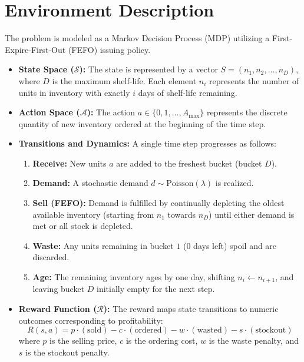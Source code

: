 \documentclass{article}
\begin{document}
\section{Environment Description}
The problem is modeled as a Markov Decision Process (MDP) utilizing a First-Expire-First-Out (FEFO) issuing policy. 
\begin{itemize}
    \item \textbf{State Space ($\mathcal{S}$):} 
    The state is represented by a vector $S = (n_1, n_2, \dots, n_D)$, where $D$ is the maximum shelf-life. Each element $n_i$ represents the number of units in inventory with exactly $i$ days of shelf-life remaining.
    
    \item \textbf{Action Space ($\mathcal{A}$):} 
    The action $a \in \{0, 1, \dots, A_{\max}\}$ represents the discrete quantity of new inventory ordered at the beginning of the time step.
    
    \item \textbf{Transitions and Dynamics:} 
    A single time step progresses as follows:
    \begin{enumerate}
        \item \textbf{Receive:} New units $a$ are added to the freshest bucket (bucket $D$).
        \item \textbf{Demand:} A stochastic demand $d \sim \text{Poisson}(\lambda)$ is realized.
        \item \textbf{Sell (FEFO):} Demand is fulfilled by continually depleting the oldest available inventory (starting from $n_1$ towards $n_D$) until either demand is met or all stock is depleted.
        \item \textbf{Waste:} Any units remaining in bucket $1$ (0 days left) spoil and are discarded.
        \item \textbf{Age:} The remaining inventory ages by one day, shifting $n_{i} \leftarrow n_{i+1}$, and leaving bucket $D$ initially empty for the next step.
    \end{enumerate}
    
    \item \textbf{Reward Function ($\mathcal{R}$):} 
    The reward maps state transitions to numeric outcomes corresponding to profitability:
    \begin{equation}
        R(s, a) = p \cdot (\text{sold}) - c \cdot (\text{ordered}) - w \cdot (\text{wasted}) - s \cdot (\text{stockout})
    \end{equation}
    where $p$ is the selling price, $c$ is the ordering cost, $w$ is the waste penalty, and $s$ is the stockout penalty.
\end{itemize}
\end{document}
